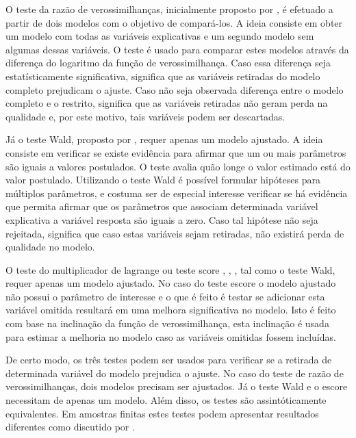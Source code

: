 O teste da razão de verossimilhanças, inicialmente proposto por \citet{trv}, é efetuado a partir de dois modelos com o objetivo de compará-los. A ideia consiste em obter um modelo com todas as variáveis explicativas e um segundo modelo sem algumas dessas variáveis. O teste é usado para comparar estes modelos através da diferença do logaritmo da função de verossimilhança. Caso essa diferença seja estatísticamente significativa, significa que as variáveis retiradas do modelo completo prejudicam o ajuste. Caso não seja observada diferença entre o modelo completo e o restrito, significa que as variáveis retiradas não geram perda na qualidade e, por este motivo, tais variáveis podem ser descartadas.

Já o teste Wald, proposto por \citet{wald}, requer apenas um modelo ajustado. A ideia consiste em verificar se existe evidência para afirmar que um ou mais parâmetros são iguais a valores postulados. O teste avalia quão longe o valor estimado está do valor postulado. Utilizando o teste Wald é possível formular hipóteses para múltiplos parâmetros, e costuma ser de especial interesse verificar se há evidência que permita afirmar que os parâmetros que associam determinada variável explicativa a variável resposta são iguais a zero. Caso tal hipótese não seja rejeitada, significa que caso estas variáveis sejam retiradas, não existirá perda de qualidade no modelo.

O teste do multiplicador de lagrange ou teste score \citep{score1}, \citep{score2}, \citep{score3}, tal como o teste Wald, requer apenas um modelo ajustado. No caso do teste escore o modelo ajustado não possui o parâmetro de interesse e o que é feito é testar se adicionar esta variável omitida resultará em uma melhora significativa no modelo. Isto é feito com base na inclinação da função de verossimilhança, esta inclinação é usada para estimar a melhoria no modelo caso as variáveis omitidas fossem incluídas.

De certo modo, os três testes podem ser usados para verificar se a retirada de determinada variável do modelo prejudica o ajuste. No caso do teste de razão de verossimilhanças, dois modelos precisam ser ajustados. Já o teste Wald e o escore necessitam de apenas um modelo. Além disso, os testes são assintóticamente equivalentes. Em amostras finitas estes testes podem apresentar resultados diferentes como discutido por \citet{conflict}.


